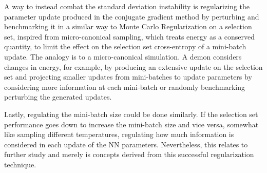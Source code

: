 A way to instead combat the standard deviation instability is regularizing the parameter update produced in the conjugate gradient method by perturbing and benchmarking it in a similar way to Monte Carlo Regularization on a selection set, inspired from micro-canonical sampling, which treats energy as a conserved quantity, to limit the effect on the selection set cross-entropy of a mini-batch update. The analogy is to a micro-canonical simulation. A demon considers changes in energy, for example, by producing an extensive update on the selection set and projecting smaller updates from mini-batches to update parameters by considering more information at each mini-batch or randomly benchmarking perturbing the generated updates.

Lastly, regulating the mini-batch size could be done similarly. If the selection set performance goes down to increase the mini-batch size and vice versa, somewhat like sampling different temperatures, regulating how much information is considered in each update of the NN parameters. Nevertheless, this relates to further study and merely is concepts derived from this successful regularization technique.